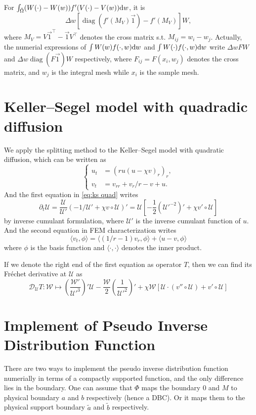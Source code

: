 \documentclass{article}
\newcommand{\frender}{\mathcal D}
\begin{document}
  For $\int_{\tilde\Omega}(W(\cdot) - W(w))f'(V(\cdot) - V(w))\mathrm d w$, it is
  \[
    \Delta w\left[\operatorname{diag}\left(f'(M_V)\vec 1\right) - f'(M_V)\right]W,
  \]
  where $M_V = V\vec 1^\top - \vec 1 V^\top$ denotes the cross matrix s.t. $M_{ij} = w_i - w_j$.
  Actually, the numerial expressions of $\int W(w)f(\cdot, w)\mathrm d w$ and $\int W(\cdot)f(\cdot, w)\mathrm d w$
  write $\Delta w FW$ and $\Delta w\operatorname{diag}(F\vec 1)W$ respectively,
  where $F_{ij} = F(x_i, w_j)$ denotes the cross matrix, and $w_j$ is the integral mesh while $x_i$ is
  the sample mesh.

  \section{Keller--Segel model with quadradic diffusion}
  We apply the splitting method to the Keller--Segel model with quadratic diffusion,
  which can be written as
  \begin{equation}
    \label{eq:ks quad}
    \left\{
      \begin{aligned}
        u_t &= (ru(u - \chi v)_r)_r, \\
        v_t &= v_{rr} + v_r / r - v + u.
      \end{aligned}
    \right.
  \end{equation}
  And the first equation in \cref{eq:ks quad} writes
  \[
    \partial_t\mathcal U = \frac{\mathcal U}{\mathcal U'}
                           (-1 / \mathcal U' + \chi v\circ\mathcal U)'
                         = \mathcal U\left[-\frac 12\left({\mathcal U'}^{-2}\right)'
                           + \chi v'\circ\mathcal U\right]
  \]
  by inverse cumulant formulation, where $\mathcal U'$ is the inverse cumulant
  function of $u$. And the second equation in FEM characterization writes
  \[
    \langle v_t, \phi\rangle
    = \langle (1 / r - 1)v_r, \phi\rangle + \langle u - v, \phi\rangle
  \]
  where $\phi$ is the basis function and $\langle\cdot, \cdot\rangle$ denotes
  the inner product.

  If we denote the right end of the first equation as operator $T$, then
  we can find its Fr\'echet derivative at $\mathcal U$ as
  \[
    \frender_{\mathcal U}T: \mathcal W\mapsto
    \left(\frac{\mathcal W'}{\mathcal U'^3}\right)'\mathcal U
    - \frac{\mathcal W}2\left(\frac1{\mathcal U'^2}\right)'
    +\chi\mathcal W\left[\mathcal U\cdot(v''\circ\mathcal U) + v'\circ\mathcal U\right]
  \]

  \section{Implement of Pseudo Inverse Distribution Function}
  There are two ways to implement the pseudo inverse distribution function numerially
  in terms of a compactly supported function,
  and the only difference lies in the boundary. One can assume that $\Phi$ maps the boundary
  $0$ and $M$ to physical boundary $a$ and $b$ respectively (hence a DBC). Or it maps them to the physical
  support boundary $\tilde a$ and $\tilde b$ respectively.
\end{document}
